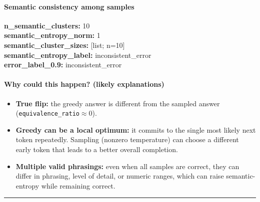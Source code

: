 \documentclass[11pt]{article}
\newcommand{\mono}[1]{\texttt{#1}}
\begin{document}
\paragraph{Semantic consistency among samples}
\textbf{n\_semantic\_clusters:} 10\\
\textbf{semantic\_entropy\_norm:} 1\\
\textbf{semantic\_cluster\_sizes:} [list; n=10]\\
\textbf{semantic\_entropy\_label:} inconsistent\_error\\
\textbf{error\_label\_0.9:} inconsistent\_error\\
\paragraph{Why could this happen? (likely explanations)}
\begin{itemize}
\item \textbf{True flip:} the greedy answer is different from the sampled answer (\mono{equivalence\_ratio}$\approx 0$).
\item \textbf{Greedy can be a local optimum:} it commits to the single most likely next token repeatedly. Sampling (nonzero temperature) can choose a different early token that leads to a better overall completion.
\item \textbf{Multiple valid phrasings:} even when all samples are correct, they can differ in phrasing, level of detail, or numeric ranges, which can raise semantic-entropy while remaining correct.
\end{itemize}
\vspace{10pt}
\hrule
\vspace{10pt}
\end{document}

